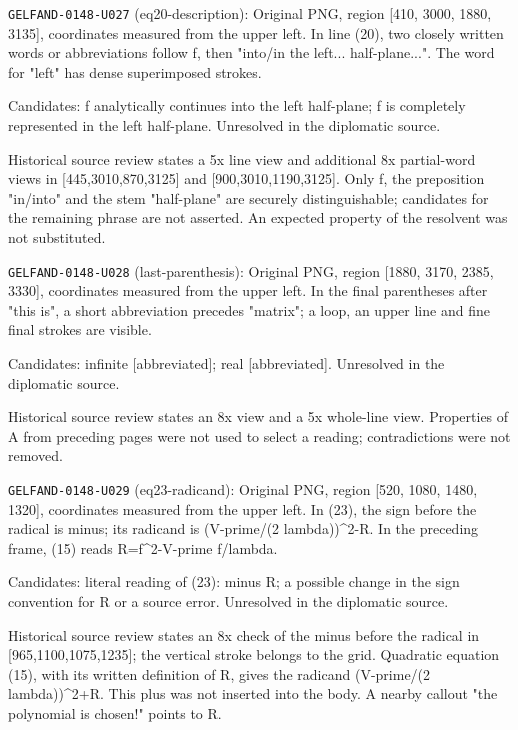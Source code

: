 \noindent\texttt{GELFAND-0148-U027} (eq20-description): Original PNG, region [410, 3000, 1880, 3135], coordinates measured from the upper left. In line (20), two closely written words or abbreviations follow f, then "into/in the left... half-plane...". The word for "left" has dense superimposed strokes.\par
Candidates: f analytically continues into the left half-plane; f is completely represented in the left half-plane. Unresolved in the diplomatic source.\par
Historical source review states a 5x line view and additional 8x partial-word views in [445,3010,870,3125] and [900,3010,1190,3125]. Only f, the preposition "in/into" and the stem "half-plane" are securely distinguishable; candidates for the remaining phrase are not asserted. An expected property of the resolvent was not substituted.\par

\noindent\texttt{GELFAND-0148-U028} (last-parenthesis): Original PNG, region [1880, 3170, 2385, 3330], coordinates measured from the upper left. In the final parentheses after "this is", a short abbreviation precedes "matrix"; a loop, an upper line and fine final strokes are visible.\par
Candidates: infinite [abbreviated]; real [abbreviated]. Unresolved in the diplomatic source.\par
Historical source review states an 8x view and a 5x whole-line view. Properties of A from preceding pages were not used to select a reading; contradictions were not removed.\par

\noindent\texttt{GELFAND-0148-U029} (eq23-radicand): Original PNG, region [520, 1080, 1480, 1320], coordinates measured from the upper left. In (23), the sign before the radical is minus; its radicand is (V-prime/(2 lambda))\textasciicircum{}2-R. In the preceding frame, (15) reads R=f\textasciicircum{}2-V-prime f/lambda.\par
Candidates: literal reading of (23): minus R; a possible change in the sign convention for R or a source error. Unresolved in the diplomatic source.\par
Historical source review states an 8x check of the minus before the radical in [965,1100,1075,1235]; the vertical stroke belongs to the grid. Quadratic equation (15), with its written definition of R, gives the radicand (V-prime/(2 lambda))\textasciicircum{}2+R. This plus was not inserted into the body. A nearby callout "the polynomial is chosen!" points to R.\par

